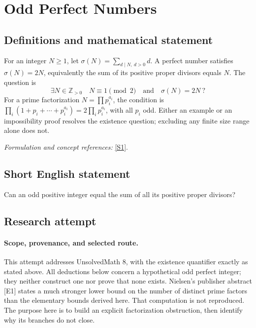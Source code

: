 \documentclass[11pt]{article}
\begin{document}
\section*{\texorpdfstring{Odd Perfect Numbers}{Odd Perfect Numbers}}\label{8}
\subsection{Definitions and mathematical statement}
For an integer $N\ge1$, let $\sigma(N)=\sum_{d\mid N,\ d>0}d$. A perfect number satisfies $\sigma(N)=2N$, equivalently the sum of its positive proper divisors equals $N$. The question is
\[
 \exists N\in{\mathbb{Z}}_{>0}\quad N\equiv1\pmod2\quad\text{and}\quad\sigma(N)=2N\ ?
\]
For a prime factorization $N=\prod p_i^{a_i}$, the condition is
$\prod_i(1+p_i+\cdots+p_i^{a_i})=2\prod_i p_i^{a_i}$, with all $p_i$ odd. Either an example or an impossibility proof resolves the existence question; excluding any finite size range alone does not.
\par\smallskip\textit{Formulation and concept references:} \href{https://www.ams.org/mcom/2015-84-295/S0025-5718-2015-02941-X/S0025-5718-2015-02941-X.pdf}{[S1]}.

\subsection{Short English statement}
Can an odd positive integer equal the sum of all its positive proper divisors?
\subsection{Research attempt}

\paragraph{Scope, provenance, and selected route.}
This attempt addresses UnsolvedMath 8, with the existence quantifier exactly
as stated above. All deductions below concern a hypothetical odd perfect
integer; they neither construct one nor prove that none exists. Nielsen's
publisher abstract [E1] states a much stronger lower bound on the number
of distinct prime factors than the elementary bounds derived here. That
computation is not reproduced. The purpose here is to build an explicit
factorization obstruction, then identify why its branches do not close.
\end{document}
